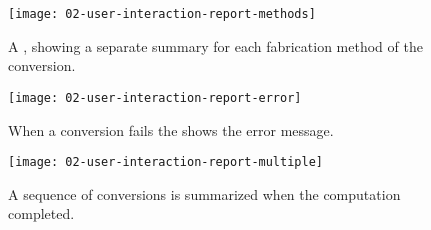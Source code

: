 \documentclass[../ClassicThesis.tex]{subfiles}
\begin{document}
\begin{figure}
  \centering
  \texttt{[image: 02-user-interaction-report-methods]}
  \caption{A , showing a separate summary for each
    fabrication method of the conversion.}
  \label{fig:report-methods}
\end{figure}

\begin{figure}
  \centering
  \texttt{[image: 02-user-interaction-report-error]}
  \caption{When a conversion fails the  shows the error
    message.}
  \label{fig:report-error}
\end{figure}

\begin{figure}
  \centering
  \texttt{[image: 02-user-interaction-report-multiple]}
  \caption{A sequence of conversions is summarized when the
    computation completed.}
  \label{fig:report-multiple}
\end{figure}
\end{document}
